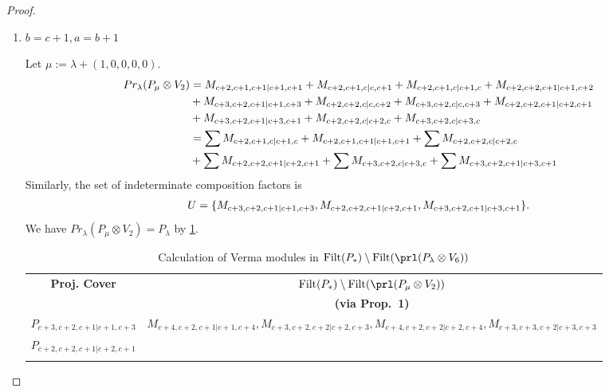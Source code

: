 \begin{proof}
\begin{enumerate}
\begin{enumerate}
      \item $b=c+1 ,a=b+1$ \par
        Let $\mu:=\lambda + (1,0,0,0,0) $. 
        \begin{equation}\notag
          \begin{aligned}
            Pr_{\lambda}(P_\mu \otimes V_{2}) &= 
M_{c+2,c+1,c+1|c+1,c+1}
+M_{c+2,c+1,c|c,c+1}
+M_{c+2,c+1,c|c+1,c}
+M_{c+2,c+2,c+1|c+1,c+2}\\
                                            &
+M_{c+3,c+2,c+1|c+1,c+3}
+M_{c+2,c+2,c|c,c+2}
+M_{c+3,c+2,c|c,c+3}
+M_{c+2,c+2,c+1|c+2,c+1}\\
                                            &
+M_{c+3,c+2,c+1|c+3,c+1}
+M_{c+2,c+2,c|c+2,c}
+M_{c+3,c+2,c|c+3,c} \\
                                               &=
\sum M_{c+2,c+1,c|c+1,c}
+M_{c+2,c+1,c+1|c+1,c+1}
+\sum M_{c+2,c+2,c|c+2,c}\\
                                            &
+\sum M_{c+2,c+2,c+1|c+2,c+1}
+\sum M_{c+3,c+2,c|c+3,c}
+\sum M_{c+3,c+2,c+1|c+3,c+1}
          \end{aligned}
        \end{equation}
      Similarly, the set of indeterminate composition factors is 
\begin{equation}\notag
  \begin{aligned}
    U = \{
M_{c+3,c+2,c+1|c+1,c+3},
M_{c+2,c+2,c+1|c+2,c+1},
M_{c+3,c+2,c+1|c+3,c+1}
\}.
  \end{aligned}
\end{equation}
       We have $Pr_{\lambda}(P_\mu \otimes V_{2}) = P_\lambda  $ by \cref{tab:verma-analysis_3}. 
\begin{table}[htbp]
\centering
\caption{Calculation of Verma modules in $\operatorname{Filt}(P_*) \setminus \operatorname{Filt}(\prl(P_\lambda \otimes V_6)) $ } \label{tab:verma-analysis_3}
\begin{tabular}{cc}
\toprule
  \textbf{Proj. Cover} & \textbf{$\operatorname{Filt}(P_*) \setminus \operatorname{Filt}(\prl(P_\mu \otimes V_2)) $}  \\
     & \textbf{(via Prop.~1)}  \\
\midrule
  $P_{c+3,c+2,c+1|c+1,c+3}$ &
  $M_{c+4,c+2,c+1|c+1,c+4},
M_{c+3,c+2,c+2|c+2,c+3},
M_{c+4,c+2,c+2|c+2,c+4},
M_{c+3,c+3,c+2|c+3,c+3}$ \\
  $P_{c+2,c+2,c+1|c+2,c+1}$ &
  \makecell{
$M_{c+2,c+3,c+1|c+3,c+1},
M_{c+2,c+2,c+2|c+2,c+2},
M_{c+3,c+2,c+2|c+3,c+2},
M_{c+3,c+2,c+2|c+2,c+3},$ \\
}
\end{tabular}
\end{table}
\end{enumerate}
\end{enumerate}
\end{proof}
